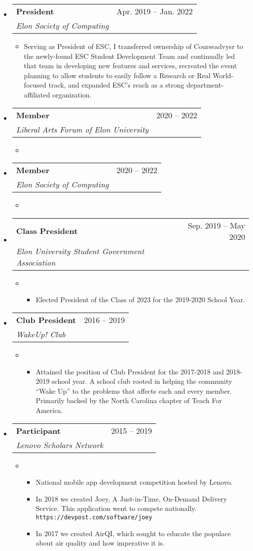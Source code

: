 \documentclass[letterpaper,10pt,draft]{article}
\makeatletter
\newcommand{\openitem}[2]{\item[] \textbf{#1} #2\vspace{2pt}}
\newcommand{\secsubheading}[4]{
\vspace{2pt}
\begin{tabular*}{6.86in}{l@{\cftdotfill{\cftsecdotsep}\extracolsep{\fill}}r}
\textbf{#1} & #3 -- #4\\
\textit{#2} \\
\end{tabular*}
}
\newcommand{\secitem}[5]{
\item[]
\secsubheading{#1}{#2}{#3}{#4}
\vspace{-10pt}
\begin{itemize}
\item[]{#5}
\end{itemize}
}
\makeatother
\begin{document}
\begin{itemize}
\secitem{President}
{Elon Society of Computing}
{Apr. 2019}{Jan. 2022}
{Serving as President of ESC, I transferred ownership of Courseadvysr to the newly-found ESC Student Development Team and continually led that team in developing new features and services, recreated the event planning to allow students to easily follow a Research or Real World-focused track, and expanded ESC’s reach as a strong department-affiliated organization.}
\secitem{Member}
{Liberal Arts Forum of Elon University}
{2020}{2022}
{}

\secitem{Member}
{Elon Society of Computing}
{2020}{2022}
{}
\secitem{Class President}
{Elon University Student Government Association}
{Sep. 2019}{May 2020}
{
\begin{itemize}
\openitem{}{Elected President of the Class of 2023 for the 2019-2020 School Year.}
\end{itemize}
}

\secitem{Club President}
{WakeUp! Club}
{2016}{2019}
{
\begin{itemize}
\openitem{}{Attained the position of Club President for the 2017-2018 and 2018-2019 school year. A school club rooted in helping the community “Wake Up” to the problems that affects each and every member. Primarily backed by the North Carolina chapter of Teach For America.}
\end{itemize}
}

\secitem{Participant}
{Lenovo Scholars Network}
{2015}{2019}
{
\begin{itemize}
\openitem{}{National mobile app development competition hosted by Lenovo.}
\openitem{}{In 2018 we created Joey, A Just-in-Time, On-Demand Delivery Service. This application went to compete nationally. \texttt{https://devpost.com/software/joey}}
\openitem{}{In 2017 we created AirQI, which sought to educate the populace about air quality and how imperative it is.}
\end{itemize}
}
\end{itemize}
\end{document}
